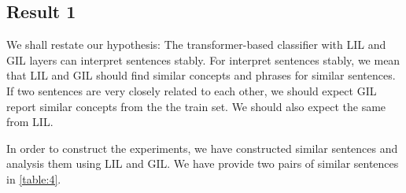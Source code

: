 \documentclass{article}
\begin{document}

\subsection{Result 1}

We shall restate our hypothesis: The transformer-based classifier with LIL and GIL layers can 
interpret sentences stably. For interpret sentences stably, we mean that LIL and GIL should 
find similar concepts and phrases for similar sentences. If two sentences are very closely related
to each other, we should expect GIL report similar concepts from the the train set. We should 
also expect the same from LIL.

In order to construct the experiments, we have constructed similar sentences and analysis them using 
LIL and GIL. We have provide two pairs of similar sentences in \ref{table:4}.
\end{document}
